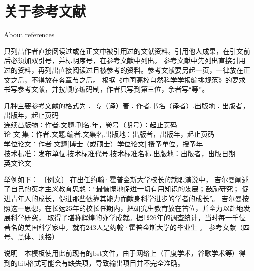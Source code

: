 \chapter{关于参考文献}{About references}

只列出作者直接阅读过或在正文中被引用过的文献资料。引用他人成果，在引文前后必须加双引号，并标明序号，在参考文献中列出。
参考文献中先列出直接引用过的资料，再列出直接阅读过且被参考的资料。参考文献要另起一页，一律放在正文之后，不得放在各章节之后。
根据《中国高校自然科学学报编排规范》的要求书写参考文献，并按顺序编码制，作者只写到第三位，余者写“等”。


几种主要参考文献的格式为：
专（译）著：作者.书名（译者）.出版地：出版者，出版年，起止页码\\
连续出版物：作者.文题.刊名.年，卷号（期号）：起止页码\\
论 文 集：作者.文题.编者.文集名.出版地：出版者，出版年，起止页码\\
学位论文：作者.文题[博士（或硕士）学位论文].授予单位，授予年\cite{许家林1999岩层移动与控制的关键层理论及其应用}\\
技术标准：发布单位.技术标准代号.技术标准名称.出版地：出版者，出版日期\\
英文论文\cite{1978Indexing}


举例如下：
〔例文〕 在出任约翰·霍普金斯大学校长的就职演说中，
吉尔曼阐述了自己的英才主义教育思想：“最慷慨地促进一切有用知识的发展；鼓励研究；
促进青年人的成长，促进那些依靠其能力而献身科学进步的学者的成长”\cite{贺国庆1998德国和美国大学发达史}。 
吉尔曼按照这一思想，在长达25年的校长任期内，把研究生教育放在首位，并全力以赴地发展科学研究，
取得了堪称辉煌的办学成就。据1926年的调查统计，当时每一千位著名的美国科学家中，就有243人是约翰·霍普金斯大学的毕业生\cite{陈树清1982美国研究生教育发展的历程及其特点} 。
参考文献（四号、黑体、顶格）


说明：本模板使用此前现有的bst文件，由于网络上（百度学术，谷歌学术等）得到的bib格式可能会有缺失项，导致输出项目并不完全准确。
